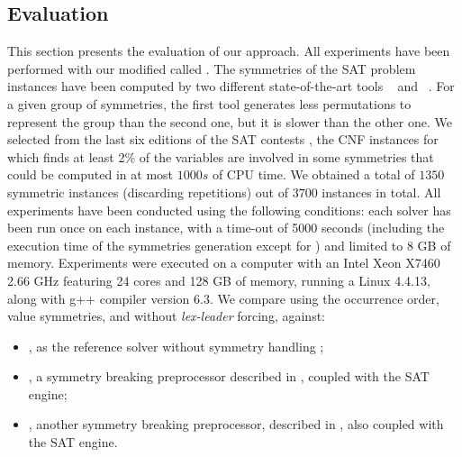 \subsection{Evaluation}
%
This section presents the evaluation of our approach. All experiments have been
performed with our modified \minisat{} called \cdclsym{}. The symmetries of the
SAT problem instances have been computed by two different state-of-the-art
tools \saucy{}~\cite{katebi2010symmetry} and
\bliss{}~\cite{JunttilaKaski:ALENEX2007}. For a given group of symmetries, the
first tool generates less permutations to represent the group than the second
one, but it is slower than the other one.
We selected from the last six editions of the SAT contests
\cite{jarvisalo2012international}, the CNF instances for which \bliss{} finds
at least 2\% of the variables are involved in some symmetries that could be
computed in at most $1000s$ of CPU time. We obtained a total of $1350$
symmetric instances (discarding repetitions) out of $3700$ instances in total.
All experiments have been conducted using the following conditions: each solver
has been run once on each instance, with a time-out of 5000 seconds (including
the execution time of the symmetries generation except for \minisat) and limited
to 8 GB of memory. Experiments were executed on a computer with an Intel Xeon
X7460 2.66 GHz featuring 24 cores and 128 GB of memory, running a Linux 4.4.13,
along with g++ compiler version 6.3.
We compare \cdclsym{} using the occurrence order, value symmetries, and without
\emph{lex-leader} forcing, against:
\begin{itemize}
 
 \item \minisat{}, as the reference solver without symmetry handling
 \cite{een2003extensible};
 
 \item \shatter{}, a symmetry breaking preprocessor described in \cite{aloul06},
 coupled with the \minisat{} SAT engine;
 
 \item \breakid{}, another symmetry breaking preprocessor, described in
 \cite{devriendt2016improved}, also coupled with the \minisat{} SAT engine.
 
\end{itemize}
